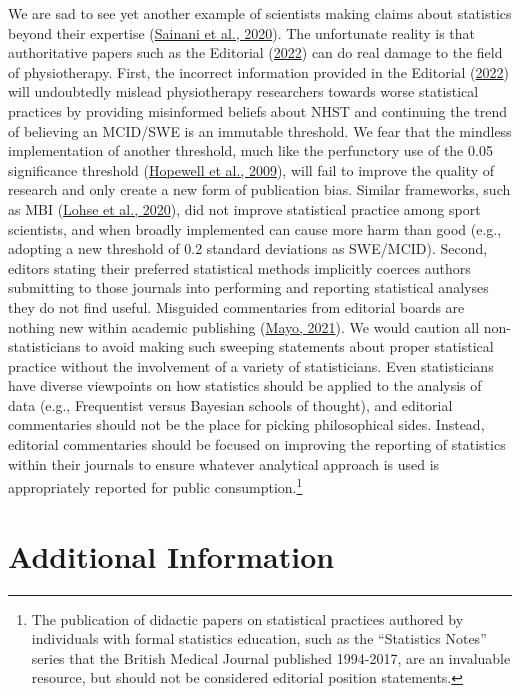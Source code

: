 \documentclass[]{cik}%
\begin{document}
We are sad to see yet another example of scientists making claims about
statistics beyond their expertise
(\protect\hyperlink{ref-sainani2020}{Sainani et al., 2020}). The
unfortunate reality is that authoritative papers such as the Editorial
(\protect\hyperlink{ref-elkins2022}{2022}) can do real damage to the
field of physiotherapy. First, the incorrect information provided in the
Editorial (\protect\hyperlink{ref-elkins2022}{2022}) will undoubtedly
mislead physiotherapy researchers towards worse statistical practices by
providing misinformed beliefs about NHST and continuing the trend of
believing an MCID/SWE is an immutable threshold. We fear that the
mindless implementation of another threshold, much like the perfunctory
use of the 0.05 significance threshold
(\protect\hyperlink{ref-hopewell2009}{Hopewell et al., 2009}), will fail
to improve the quality of research and only create a new form of
publication bias. Similar frameworks, such as MBI
(\protect\hyperlink{ref-lohse2020systematic}{Lohse et al., 2020}), did
not improve statistical practice among sport scientists, and when
broadly implemented can cause more harm than good (e.g., adopting a new
threshold of 0.2 standard deviations as SWE/MCID). Second, editors
stating their preferred statistical methods implicitly coerces authors
submitting to those journals into performing and reporting statistical
analyses they do not find useful. Misguided commentaries from editorial
boards are nothing new within academic publishing
(\protect\hyperlink{ref-mayo2021}{Mayo, 2021}). We would caution all
non-statisticians to avoid making such sweeping statements about proper
statistical practice without the involvement of a variety of
statisticians. Even statisticians have diverse viewpoints on how
statistics should be applied to the analysis of data (e.g., Frequentist
versus Bayesian schools of thought), and editorial commentaries should
not be the place for picking philosophical sides. Instead, editorial
commentaries should be focused on improving the reporting of statistics
within their journals to ensure whatever analytical approach is used is
appropriately reported for public consumption.\footnote{The publication
  of didactic papers on statistical practices authored by individuals
  with formal statistics education, such as the ``Statistics Notes''
  series that the British Medical Journal published 1994-2017, are an
  invaluable resource, but should not be considered editorial position
  statements.}

\newpage

\hypertarget{additional-information}{%
\section{Additional Information}\label{additional-information}}
\end{document}
